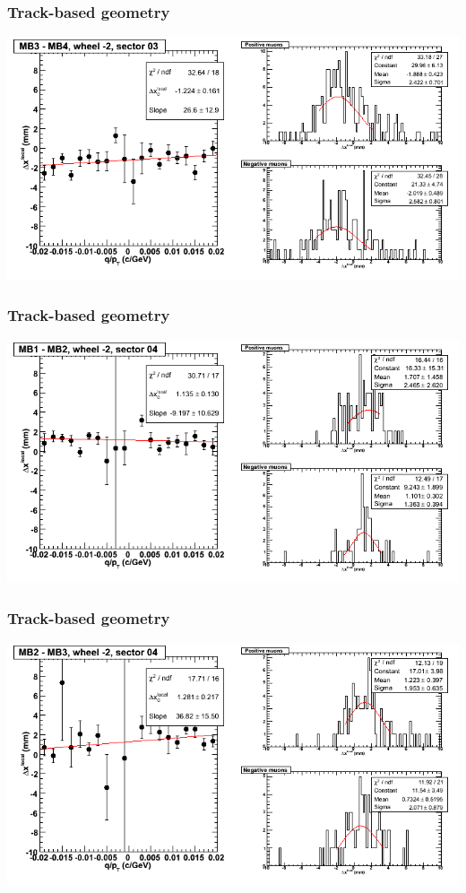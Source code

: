 \documentclass[compress]{beamer}
\begin{document}
\begin{frame}
\frametitle{Track-based geometry}
\includegraphics[width=\linewidth]{NOV4_segdiffs/dt13_resid_A_03_34.png}
\end{frame}

\begin{frame}
\frametitle{Track-based geometry}
\includegraphics[width=\linewidth]{NOV4_segdiffs/dt13_resid_A_04_12.png}
\end{frame}

\begin{frame}
\frametitle{Track-based geometry}
\includegraphics[width=\linewidth]{NOV4_segdiffs/dt13_resid_A_04_23.png}
\end{frame}
\end{document}
